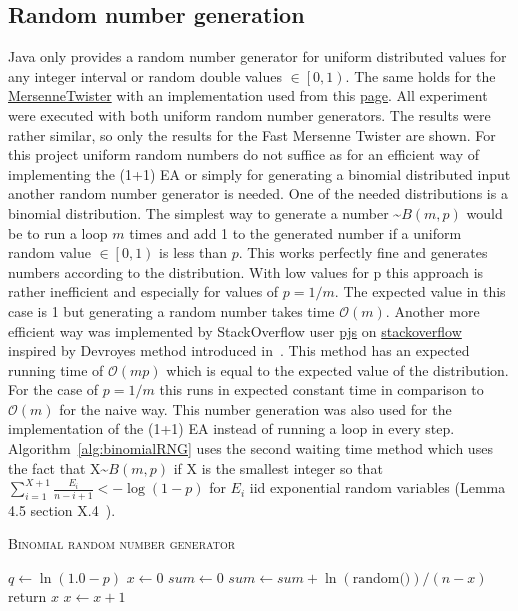 \subsection{Random number generation}
Java only provides a random number generator for uniform distributed values for any integer interval or random double values $\in \left[0, 1\right)$.
The same holds for the \href{http://www.math.sci.hiroshima-u.ac.jp/m-mat/MT/emt.html}{MersenneTwister} with an implementation used from this \href{https://cs.gmu.edu/~sean/research/}{page}.
All experiment were executed with both uniform random number generators.
The results were rather similar, so only the results for the Fast Mersenne Twister are shown.
For this project uniform random numbers do not suffice as for an efficient way of implementing the (1+1) EA or simply for generating a binomial distributed input another random number generator is needed.
One of the needed distributions is a binomial distribution.
The simplest way to generate a number \textasciitilde$B(m,p)$ would be to run a loop $m$ times and add 1 to the generated number if a uniform random value $\in \left[0, 1\right)$ is less than $p$.
This works perfectly fine and generates numbers according to the distribution.
With low values for p this approach is rather inefficient and especially for values of $p=1/m$.
The expected value in this case is 1 but generating a random number takes time $\mathcal{O}(m)$.
Another more efficient way was implemented by StackOverflow user \href{https://stackoverflow.com/users/2166798/pjs}{pjs} on \href{https://stackoverflow.com/questions/23561551/a-efficient-binomial-random-number-generator-code-in-java}{stackoverflow} inspired by Devroyes method introduced in~\cite{devroye2006nonuniform}.
This method has an expected running time of $\mathcal{O}(mp)$ which is equal to the expected value of the distribution.
For the case of $p=1/m$ this runs in expected constant time in comparison to $\mathcal{O}(m)$ for the naive way.
This number generation was also used for the implementation of the (1+1) EA instead of running a loop in every step.
Algorithm~\ref{alg:binomialRNG} uses the second waiting time method which uses the fact that X\textasciitilde$B(m,p)$ if X is the smallest integer so that \(\sum_{i=1}^{X+1}{\frac{E_i}{n-i+1}}<-\log(1-p)\) for $E_i$ iid exponential random variables (Lemma 4.5 section X.4~\cite{devroye2006nonuniform}).

\begin{algorithm}[h]
      \caption{\textsc{Binomial random number generator}}\label{alg:binomialRNG}

      \DontPrintSemicolon%
      $q \leftarrow \ln(1.0 - p)$\;
      $x \leftarrow 0$\;
      $sum \leftarrow 0$\;
      {
      $sum \leftarrow sum +\ln(\text{random()}) / (n - x)$\; \tcp{random() generates a random value $\in \left[0, 1\right)$}
      {
            return $x$\;
      }
      $x \leftarrow x + 1$\;
      }
\end{algorithm}

